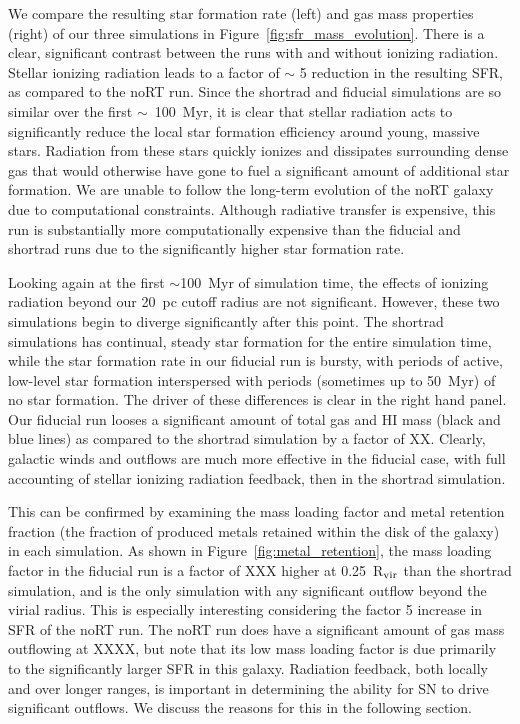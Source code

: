 \documentclass[twocolumn]{aastex62}
\begin{document}
We compare the resulting star formation rate (left) and gas mass properties (right) of our three simulations in Figure~\ref{fig:sfr_mass_evolution}. There is a clear, significant contrast between the runs with and without ionizing radiation. Stellar ionizing radiation leads to a factor of $\sim$ 5 reduction in the resulting SFR, as compared to the noRT run. Since the shortrad and fiducial simulations are so similar over the first $\sim$~100~Myr, it is clear that stellar radiation acts to significantly reduce the local star formation efficiency around young, massive stars. Radiation from these stars quickly ionizes and dissipates surrounding dense gas that would otherwise have gone to fuel a significant amount of additional star formation. We are unable to follow the long-term evolution of the noRT galaxy due to computational constraints. Although radiative transfer is expensive, this run is substantially more computationally expensive than the fiducial and shortrad runs due to the significantly higher star formation rate.

Looking again at the first $\sim$100~Myr of simulation time, the effects of ionizing radiation beyond our 20~pc cutoff radius are not significant. However, these two simulations begin to diverge significantly after this point. The shortrad simulations has continual, steady star formation for the entire simulation time, while the star formation rate in our fiducial run is bursty, with periods of active, low-level star formation interspersed with periods (sometimes up to 50~Myr) of no star formation. The driver of these differences is clear in the right hand panel. Our fiducial run looses a significant amount of total gas and HI mass (black and blue lines) as compared to the shortrad simulation by a factor of XX. Clearly, galactic winds and outflows are much more effective in the fiducial case, with full accounting of stellar ionizing radiation feedback, then in the shortrad simulation.

This can be confirmed by examining the mass loading factor and metal retention fraction (the fraction of produced metals retained within the disk of the galaxy) in each simulation. As shown in Figure~\ref{fig:metal_retention}, the mass loading factor in the fiducial run is a factor of XXX higher at 0.25~R$_{\rm vir}$ than the shortrad simulation, and is the only simulation with any significant outflow beyond the virial radius. This is especially interesting considering the factor 5 increase in SFR of the noRT run. The noRT run does have a significant amount of gas mass outflowing at XXXX, but note that its low mass loading factor is due primarily to the significantly larger SFR in this galaxy. Radiation feedback, both locally and over longer ranges, is important in determining the ability for SN to drive significant outflows. We discuss the reasons for this in the following section.
\end{document}
